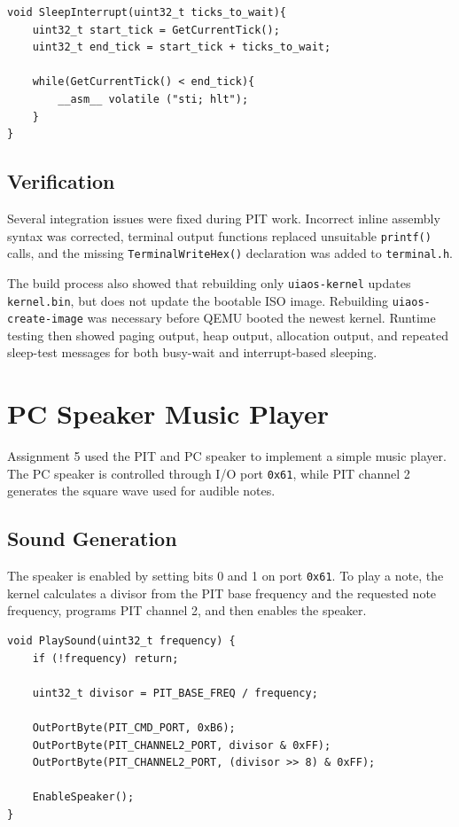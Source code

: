 \begin{listing}[H]
\begin{verbatim}
void SleepInterrupt(uint32_t ticks_to_wait){
    uint32_t start_tick = GetCurrentTick();
    uint32_t end_tick = start_tick + ticks_to_wait;

    while(GetCurrentTick() < end_tick){
        __asm__ volatile ("sti; hlt");
    }
}
\end{verbatim}
\caption{Interrupt-based sleeping using the PIT tick counter and \texttt{hlt}.}
\end{listing}

\subsection{Verification}
Several integration issues were fixed during PIT work. Incorrect inline assembly syntax was corrected, terminal output functions replaced unsuitable \texttt{printf()} calls, and the missing \texttt{TerminalWriteHex()} declaration was added to \texttt{terminal.h}.

The build process also showed that rebuilding only \texttt{uiaos-kernel} updates \texttt{kernel.bin}, but does not update the bootable ISO image. Rebuilding \texttt{uiaos-create-image} was necessary before QEMU booted the newest kernel. Runtime testing then showed paging output, heap output, allocation output, and repeated sleep-test messages for both busy-wait and interrupt-based sleeping.

\section{PC Speaker Music Player}

Assignment 5 used the PIT and PC speaker to implement a simple music player. The PC speaker is controlled through I/O port \texttt{0x61}, while PIT channel 2 generates the square wave used for audible notes\cite{osdevPcSpeaker}.

\subsection{Sound Generation}
The speaker is enabled by setting bits 0 and 1 on port \texttt{0x61}. To play a note, the kernel calculates a divisor from the PIT base frequency and the requested note frequency, programs PIT channel 2, and then enables the speaker.

\begin{listing}[H]
\begin{verbatim}
void PlaySound(uint32_t frequency) {
    if (!frequency) return;

    uint32_t divisor = PIT_BASE_FREQ / frequency;

    OutPortByte(PIT_CMD_PORT, 0xB6);
    OutPortByte(PIT_CHANNEL2_PORT, divisor & 0xFF);
    OutPortByte(PIT_CHANNEL2_PORT, (divisor >> 8) & 0xFF);

    EnableSpeaker();
}
\end{verbatim}
\caption{Programming PIT channel 2 to generate a PC speaker tone.}
\end{listing}
\clearpage

